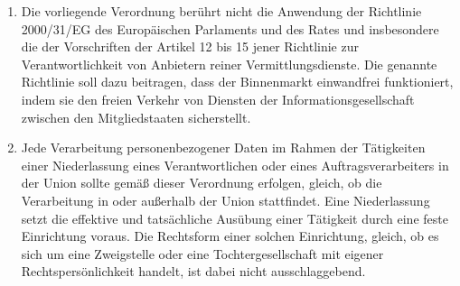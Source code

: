 \begin{enumerate}
   \item Die vorliegende Verordnung berührt nicht die Anwendung der Richtlinie 2000/31/EG des Europäischen Parlaments
    und des Rates und insbesondere die der Vorschriften der Artikel 12 bis 15 jener Richtlinie zur
    Verantwortlichkeit von Anbietern reiner Vermittlungsdienste. Die genannte Richtlinie soll dazu beitragen, dass der
    Binnenmarkt einwandfrei funktioniert, indem sie den freien Verkehr von Diensten der Informationsgesellschaft
    zwischen den Mitgliedstaaten sicherstellt.%
   \label{itm:eg-21}
   

   \item Jede Verarbeitung personenbezogener Daten im Rahmen der Tätigkeiten einer Niederlassung eines Verantwortlichen
    oder eines Auftragsverarbeiters in der Union sollte gemäß dieser Verordnung erfolgen, gleich, ob die Verarbeitung
    in oder außerhalb der Union stattfindet. Eine Niederlassung setzt die effektive und tatsächliche Ausübung einer
    Tätigkeit durch eine feste Einrichtung voraus. Die Rechtsform einer solchen Einrichtung, gleich, ob es sich um eine
    Zweigstelle oder eine Tochtergesellschaft mit eigener Rechtspersönlichkeit handelt, ist dabei nicht
    ausschlaggebend.%
   \label{itm:eg-22}
   


\end{enumerate}
